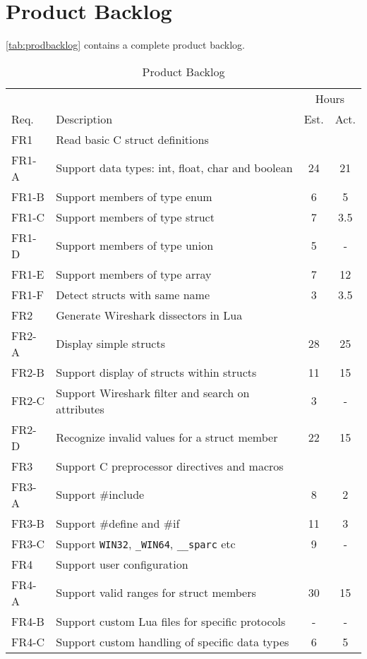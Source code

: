 \section{Product Backlog}
\label{sec:prodbacklog}
\autoref{tab:prodbacklog} contains a complete product backlog.

\begin{table}[ht] \small \center
\caption{Product Backlog \label{tab:prodbacklog}}
\begin{tabularx}{\textwidth}{l X c c}
	\toprule
	& & \multicolumn{2}{c}{Hours} \\
	\cmidrule(r){3-4}
	Req. & Description & Est. & Act. \\
	\midrule
	FR1 & Read basic C struct definitions & & \\
	FR1-A & Support data types: int, float, char and boolean & 24 & 21 \\
	FR1-B & Support members of type enum & 6 & 5 \\
	FR1-C & Support members of type struct & 7 & 3.5 \\
	FR1-D & Support members of type union & 5 & - \\
	FR1-E & Support members of type array & 7 & 12 \\
	FR1-F & Detect structs with same name & 3 & 3.5 \\
	\addlinespace
	FR2 & Generate Wireshark dissectors in Lua & & \\
	FR2-A & Display simple structs & 28 & 25 \\
	FR2-B & Support display of structs within structs & 11 & 15 \\
	FR2-C & Support Wireshark filter and search on attributes & 3 & - \\
	FR2-D & Recognize invalid values for a struct member & 22 & 15 \\
	\addlinespace
	FR3 & Support C preprocessor directives and macros & & \\
	FR3-A & Support \#include & 8 & 2 \\
	FR3-B & Support \#define and \#if & 11 & 3 \\
	FR3-C & Support \verb+WIN32+, \verb+_WIN64+, \verb+__sparc+ etc & 9 & - \\
	\addlinespace
	FR4 & Support user configuration & & \\
	FR4-A & Support valid ranges for struct members & 30 & 15 \\
	FR4-B & Support custom Lua files for specific protocols & - & - \\
	FR4-C & Support custom handling of specific data types & 6 & 5 \\

\end{tabularx}
\end{table}
